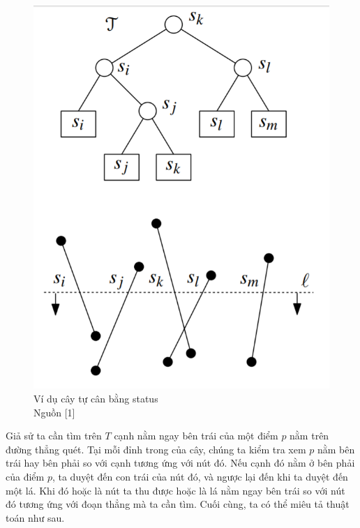 \documentclass[15pt]{article}
\begin{document}
{\begin{figure}[h!]
\centering
\includegraphics[scale=0.35]{./status_tree.png}
\caption{Ví dụ cây tự cân bằng status \\ Nguồn [1]}
\label{fig:status tree exampels}
\end{figure}

Giả sử ta cần tìm trên $T$ cạnh nằm ngay bên trái của một điểm $p$ nằm trên đường thẳng quét. Tại mỗi đỉnh trong của cây, chúng ta kiểm tra xem $p$ nằm bên trái hay bên phải so với cạnh tương ứng với nút đó. Nếu cạnh đó nằm ở bên phải của điểm $p$, ta duyệt đến con trái của nút đó, và ngược lại đến khi ta duyệt đến một lá. Khi đó hoặc là nút ta thu được hoặc là lá nằm ngay bên trái so với nút đó tương ứng với đoạn thẳng mà ta cần tìm. Cuối cùng, ta có thể miêu tả thuật toán như sau. \\

}
\end{document}
